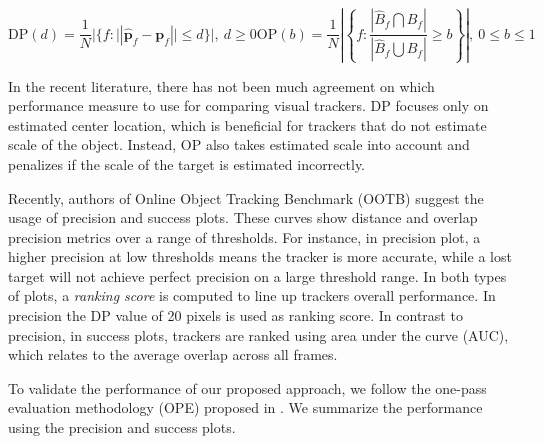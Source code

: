 \begin{subequations}
\begin{equation}
	\mathrm{DP}(d) = \frac{1}{N}|\{f:||\mathbf{\hat{p}}_f - \mathbf{p}_f|| \leq d\}|,\:d\geq 0
\label{eq::precision}
\end{equation}

\begin{equation}
	\mathrm{OP}(b) = \frac{1}{N}\left | \left \{ f: \frac{|\hat{B}_f \bigcap B_f|}
										{|\hat{B}_f \bigcup  B_f|}
	 \geq b \right \} \right |,\:0 \leq b\leq 1
\label{eq::overlap}
\end{equation}
\end{subequations}

In the recent literature, there has not been much agreement on which
performance measure to use for comparing visual trackers. DP focuses only
on estimated center location, which is beneficial for trackers that do not
estimate scale of the object. Instead, OP also takes estimated scale into
account and penalizes if the scale of the target is estimated incorrectly.

Recently, authors of Online Object Tracking Benchmark (OOTB) suggest the usage
of precision and success plots. These curves show distance and \gls{overlap} precision metrics over a range of
thresholds. For instance, in precision plot, a higher precision at low
thresholds means the tracker is more accurate, while a lost target will not
achieve perfect precision on a large threshold range. In both types of plots,
a \textit{ranking score} is computed to line up trackers overall performance.
In precision the DP value of 20 pixels is used as ranking score. In contrast to precision, in success plots, trackers are ranked using area under
the curve (AUC), which relates to the average overlap across all frames. 

To validate the performance of our proposed approach, we follow the one-pass
evaluation methodology (OPE) proposed in \cite{Wu2013B}. 
We summarize the performance using the precision and success plots.

